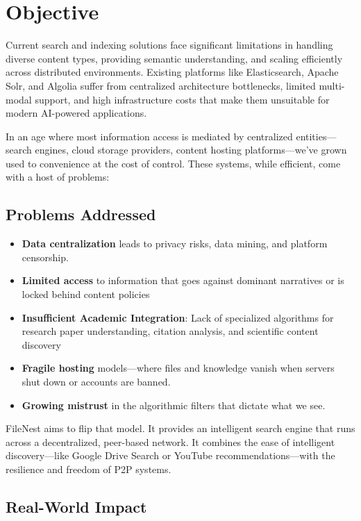 \documentclass[11pt,a4paper]{article}
\begin{document}
\section{Objective}

Current search and indexing solutions face significant limitations in handling diverse content types, providing semantic understanding, and scaling efficiently across distributed environments. Existing platforms like Elasticsearch, Apache Solr, and Algolia suffer from centralized architecture bottlenecks, limited multi-modal support, and high infrastructure costs that make them unsuitable for modern AI-powered applications.

In an age where most information access is mediated by centralized entities—search engines, cloud storage providers, content hosting platforms—we've grown used to convenience at the cost of control. These systems, while efficient, come with a host of problems:

\subsection{Problems Addressed}
\begin{itemize}
    \item \textbf{Data centralization} leads to privacy risks, data mining, and platform censorship.
    \item \textbf{Limited access} to information that goes against dominant narratives or is locked behind content policies
    \item \textbf{Insufficient Academic Integration}: Lack of specialized algorithms for research paper understanding, citation analysis, and scientific content discovery
    \item \textbf{Fragile hosting} models—where files and knowledge vanish when servers shut down or accounts are banned.
    \item \textbf{Growing mistrust} in the algorithmic filters that dictate what we see.
\end{itemize}

FileNest aims to flip that model. It provides an intelligent search engine that runs across a decentralized, peer-based network.
It combines the ease of intelligent discovery—like Google Drive Search or YouTube recommendations—with the resilience and freedom of P2P systems.

\subsection{Real-World Impact}
\end{document}
